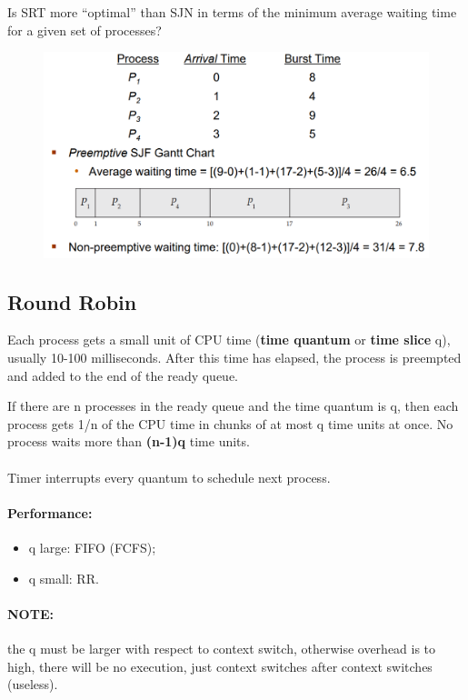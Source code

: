 Is SRT more “optimal” than SJN in terms of the minimum average waiting time for a given set of processes?


\begin{figure}[htbp]
    \centering
    \includegraphics[width=0.65\linewidth]{img/SRTF.png}
  
\end{figure}

\newpage
\subsection{Round Robin}

Each process gets a small unit of CPU time (\textbf{time quantum} or \textbf{time slice} q), usually 10-100 milliseconds. After this time has elapsed, the process is preempted and added to the end of the ready queue.

If there are n processes in the ready queue and the time quantum
is q, then each process gets 1/n of the CPU time in chunks of at
most q time units at once. No process waits more than \textbf{(n-1)q}
time units.

\paragraph{}
Timer interrupts every quantum to schedule next process.

\paragraph{Performance:}
\begin{itemize}
    \item [] q large: FIFO (FCFS);
    \item [] q small: RR.
\end{itemize}

\paragraph{NOTE:} the q must be larger with respect to context switch, otherwise overhead is to high, there will be no execution, just context switches after context switches (useless).


